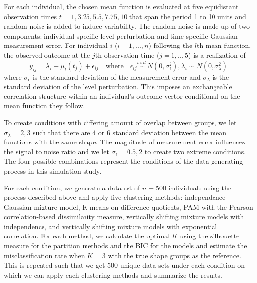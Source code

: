 \documentclass[12pt]{article}
\begin{document}
For each individual, the chosen mean function is evaluated at five equidistant observation times $t=1,3.25,5.5,7.75,10$ that span the period 1 to 10 units and random noise is added to induce variability. The random noise is made up of two components: individual-specific level perturbation and time-specific Gaussian measurement error. For individual $i$ ($i=1,...,n$)  following the $l$th mean function, the observed outcome at the $j$th observation time ($j=1,..,5$) is a realization of
$$y_{ij} = \lambda_{i}+\mu_{l}(t_{j})+\epsilon_{ij}\quad\text{where}\quad \epsilon_{ij}\stackrel{i.i.d.}{\sim} N(0,\sigma_{\epsilon}^{2}), \lambda_{i}\sim N(0,\sigma_{\lambda}^{2})$$
where $\sigma_{\epsilon}$  is the standard deviation of the measurement error and $\sigma_{\lambda}$ is the standard deviation of the level perturbation. This imposes an exchangeable correlation structure within an individual's outcome vector conditional on the mean function they follow. 

To create conditions with differing amount of overlap between groups, we let $\sigma_{\lambda}=2,3$ such that there are 4 or 6 standard deviation between the mean functions with the same shape. The magnitude of measurement error influences the signal to noise ratio and we let $\sigma_{\epsilon}=0.5, 2$ to create two extreme conditions. The four possible combinations represent the conditions of the data-generating process in this simulation study. 

For each condition, we generate a data set of $n=500$ individuals using the process described above and apply five clustering methods: independence Gaussian mixture model, K-means on difference quotients, PAM with the Pearson correlation-based dissimilarity measure, vertically shifting mixture models with independence, and vertically shifting mixture models with exponential correlation. For each method, we calculate the optimal $K$ using the silhouette measure \cite{kaufman1990}  for the partition methods and the BIC \cite{schwarz1978} for the models and estimate the misclassification rate when $K=3$ with the true shape groups as the reference. This is repeated such that we get 500 unique data sets under each condition on which we can apply each clustering methods and summarize the results. 
\end{document}
